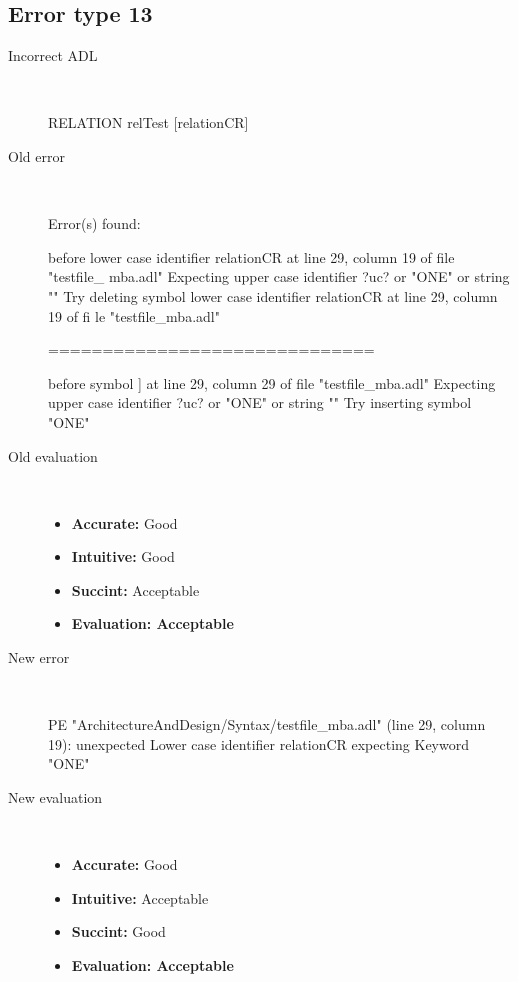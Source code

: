 \hrulefill

\subsection{Error type 13}
  \begin{description}
  \item[Incorrect ADL]~\\
\begin{adl}
RELATION relTest [relationCR]\end{adl}
  \item[Old error]~\\
\begin{haskell}
Error(s) found:

before lower case identifier relationCR at line 29, column 19 of file "testfile_
mba.adl"
Expecting upper case identifier ?uc? or "ONE" or string ""
Try deleting symbol lower case identifier relationCR at line 29, column 19 of fi
le "testfile_mba.adl"

==============================

before symbol ] at line 29, column 29 of file "testfile_mba.adl"
Expecting upper case identifier ?uc? or "ONE" or string ""
Try inserting symbol "ONE"
\end{haskell}
  \item[Old evaluation]~\\
    \begin{itemize}
    \item \textbf{Accurate:} Good
    \item \textbf{Intuitive:} Good
    \item \textbf{Succint:} Acceptable
    \item \textbf{Evaluation: Acceptable}
    \end{itemize}
  \item[New error]~\\
\begin{haskell}
PE "ArchitectureAndDesign/Syntax/testfile_mba.adl" (line 29, column 19):
unexpected Lower case identifier relationCR
expecting Keyword "ONE"\end{haskell}
  \item[New evaluation]~\\
    \begin{itemize}
    \item \textbf{Accurate:} Good
    \item \textbf{Intuitive:} Acceptable
    \item \textbf{Succint:} Good
    \item \textbf{Evaluation: Acceptable
}
    \end{itemize}
  \end{description}

